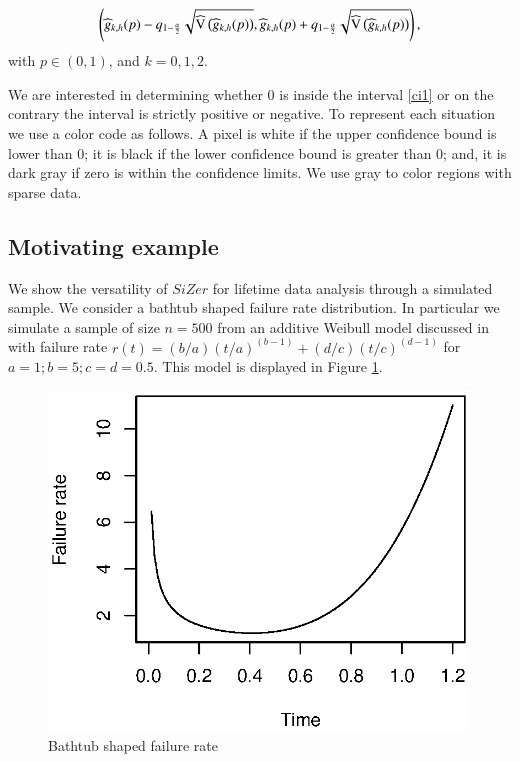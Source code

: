 \documentclass[preprint,12pt]{elsarticle}
\begin{document}
\begin{equation}\label{ci1}
\left(\widehat{g}_{k,h}(p)-q_{1-\frac{\alpha}{2}}\sqrt{{\rm \widehat{V}}\left(\widehat{g}_{k,h}(p)\right)},\widehat{g}_{k,h}(p)+q_{1-\frac{\alpha}{2}}\sqrt{{\rm \widehat{V}}\left(\widehat{g}_{k,h}(p)\right)}\right),
\end{equation}
 with $p \in (0,1)$, and $k=0,1,2$.

We are interested in determining whether 0 is inside the interval \eqref{ci1} or on the contrary the interval is strictly positive or negative. To represent each situation we use a color code as follows. A pixel is white if the upper confidence bound is lower than 0; it is black if the lower confidence  bound is greater than 0; and, it is  dark gray if zero is within the confidence limits. We use gray to color regions with sparse data.

\subsection{Motivating example}
We show the versatility of $SiZer$ for lifetime data analysis through a simulated sample. We consider a bathtub shaped failure rate distribution. In particular we simulate a sample of size $n=500$ from an additive Weibull model discussed in \cite{XieLai96}with failure rate $r(t)=(b/a)(t/a)^{(b-1)}+(d/c)(t/c)^{(d-1)}$ for $a=1;b=5;c=d=0.5$. This model is displayed in Figure \ref{Fig:simulatedhazard}.

\begin{figure}[htb]
\begin{center}
\includegraphics[height=9cm]{motivatinghazard.eps}
\caption{Bathtub shaped failure rate}\label{Fig:simulatedhazard}
\end{center}
\end{figure}
\end{document}
